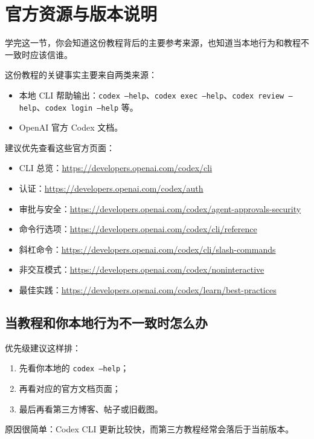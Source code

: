 \documentclass[UTF8,a4paper,12pt]{ctexart}
\begin{document}
\section{官方资源与版本说明}

\begin{learnbox}
学完这一节，你会知道这份教程背后的主要参考来源，也知道当本地行为和教程不一致时应该信谁。
\end{learnbox}

这份教程的关键事实主要来自两类来源：
\begin{itemize}
  \item 本地 CLI 帮助输出：\texttt{codex --help}、\texttt{codex exec --help}、\texttt{codex review --help}、\texttt{codex login --help} 等。
  \item OpenAI 官方 Codex 文档。
\end{itemize}

建议优先查看这些官方页面：
\begin{itemize}
  \item CLI 总览：\url{https://developers.openai.com/codex/cli}
  \item 认证：\url{https://developers.openai.com/codex/auth}
  \item 审批与安全：\url{https://developers.openai.com/codex/agent-approvals-security}
  \item 命令行选项：\url{https://developers.openai.com/codex/cli/reference}
  \item 斜杠命令：\url{https://developers.openai.com/codex/cli/slash-commands}
  \item 非交互模式：\url{https://developers.openai.com/codex/noninteractive}
  \item 最佳实践：\url{https://developers.openai.com/codex/learn/best-practices}
\end{itemize}

\subsection{当教程和你本地行为不一致时怎么办}

优先级建议这样排：
\begin{enumerate}
  \item 先看你本地的 \texttt{codex --help}；
  \item 再看对应的官方文档页面；
  \item 最后再看第三方博客、帖子或旧截图。
\end{enumerate}

\begin{advancedbox}
原因很简单：Codex CLI 更新比较快，而第三方教程经常会落后于当前版本。
\end{advancedbox}
\end{document}
